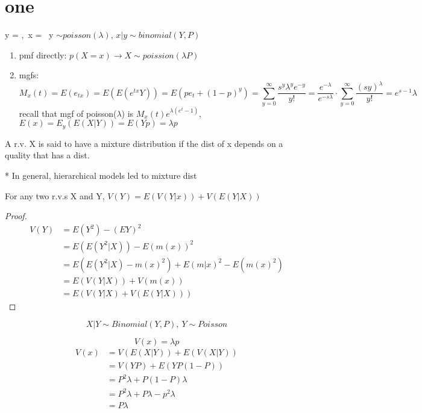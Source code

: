 \documentclass[a4paper]{article}
\begin{document}
\section*{one}
\begin{example}
    y = ,\ 
    x = \ 
    y $\sim poisson(\lambda)$, $x|y\sim binomial(Y,P)$ 
\end{example}

\begin{enumerate}
    \item pmf directly: $p(X=x)\to X\sim poission(\lambda P)$ 
    \item mgfs: \[
    M_{x}(t)=E(e_{tx})=E(E(e^{tx}Y))=E(pe_{t}+(1-p)^{y})=\sum_{y=0}^{\infty} \frac{s^{y}\lambda^{y}e^{-y}}{y!}=\frac{e^{-\lambda}}{e^{-s\lambda}}\cdot
    \sum_{y=0}^{\infty} \frac{(sy)^{\lambda}}{y!}=e^{s-1}\lambda
    \]  
    recall that mgf of poisson($\lambda$) is $M_{x}(t)e^{\lambda (e^{t}-1)}$, $E(x)=E_{y}(E(X|Y))=E(Yp)=\lambda p$
\end{enumerate}

\begin{definition}
    A r.v. X is said to have a mixture distribution if the dist of x depends on a quality that has a dist. 
\end{definition}
* In general, hierarchical models led to mixture dist

\begin{theorem}
    For any two r.v.s X and Y, $V(Y)=E(V(Y|x))+V(E(Y|X)) $ 
\end{theorem}

\begin{proof}
    \begin{align*}
    V(Y)&=E(Y^{2})-(EY)^{2}\\
    &= E(E(Y^{2}|X))-E(m(x))^{2} \\
    &= E(E(Y^{2}|X)-m(x)^{2})+E(m|x)^{2}-E(m(x)^{2}) \\
    &= E(V(Y|X))+V(m(x)) \\
    &= E(V(Y|X)+V(E(Y|X)))
\end{align*}

\end{proof}


\begin{example}
    \[
    X|Y\sim Binomial(Y,P),\ 
    Y\sim Poisson 
    \] 
\end{example}
\[
V(x)=\lambda p
\]
\begin{align*}
   V(x)&=V(E(X|Y))+E(V(X|Y))\\
   &=V(YP)+E(YP(1-P)) \\
   &= P^{2}\lambda+P(1-P)\lambda \\
   &= P^{2}\lambda+P\lambda-p^{2}\lambda \\
   &= P\lambda \\
\end{align*}
\end{document}
